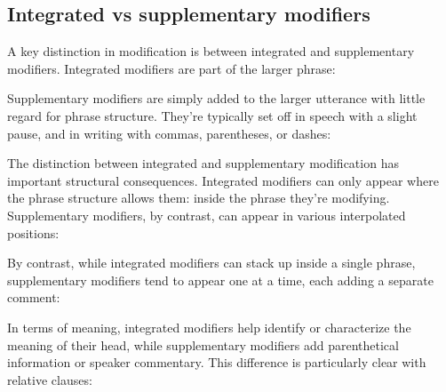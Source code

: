 \ea\label{ex:adv-order}
   \z
\z

\subsection{Integrated vs supplementary modifiers}

A key distinction in modification is between integrated and supplementary modifiers. Integrated modifiers are part of the larger phrase:

\ea\label{ex:restrictive}
   \z
\z
Supplementary modifiers are simply added to the larger utterance with little regard for phrase structure. They're typically set off in speech with a slight pause, and in writing with commas, parentheses, or dashes:

\ea\label{ex:supplement}
    \z
\z
The distinction between integrated and supplementary modification has important structural consequences. Integrated modifiers can only appear where the phrase structure allows them: inside the phrase they're modifying. Supplementary modifiers, by contrast, can appear in various interpolated positions:

\ea\label{ex:supplement-position}
    \z
\z
By contrast, while integrated modifiers can stack up inside a single phrase, supplementary modifiers tend to appear one at a time, each adding a separate comment:

\ea\label{ex:supplement-stack}
    \z
\z
In terms of meaning, integrated modifiers help identify or characterize the meaning of their head, while supplementary modifiers add parenthetical information or speaker commentary. This difference is particularly clear with relative clauses:

